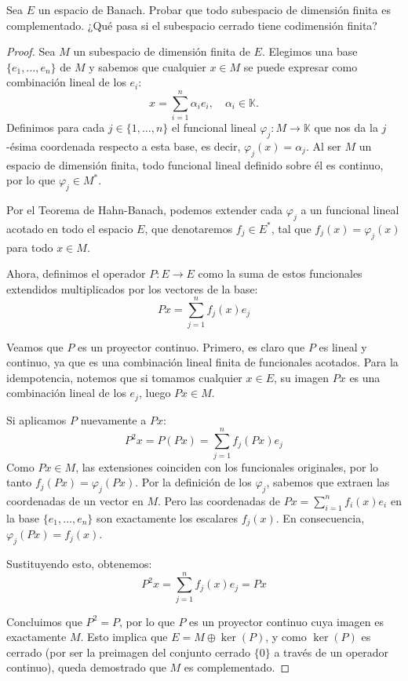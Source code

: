\documentclass{article}
\theoremstyle{definition}
\newenvironment{ejercicio}[1]{\begin{trivlist}
\item[\hskip \labelsep {\bfseries Ejercicio}\hskip \labelsep {\bfseries #1.}]}{\end{trivlist}}
\begin{document}
\begin{ejercicio}{2}
	Sea \( E \) un espacio de Banach. Probar que todo subespacio de dimensión finita es complementado. ¿Qué pasa si el subespacio cerrado tiene codimensión finita?
\end{ejercicio}
\begin{proof}
	Sea \( M \) un subespacio de dimensión finita de \( E \). Elegimos una base \( \{ e_1, \ldots, e_n \} \) de \( M \) y sabemos que cualquier \( x \in M \) se puede expresar como combinación lineal de los \( e_i \):\[
		x = \sum_{i=1}^{n} \alpha_i e_i, \quad \alpha_i \in \mathbb{K}.
	\]
	Definimos para cada \(j \in \{1, \dots, n\} \) el funcional lineal \(\varphi_j : M \to \mathbb{K}\) que nos da la \(j\)-ésima coordenada respecto a esta base, es decir, \(\varphi_j(x) = \alpha_j\). Al ser \(M\) un espacio de dimensión finita, todo funcional lineal definido sobre él es continuo, por lo que \(\varphi_j \in M^*\).

	Por el Teorema de Hahn-Banach, podemos extender cada \(\varphi_j\) a un funcional lineal acotado en todo el espacio \(E\), que denotaremos \(f_j \in E^*\), tal que \(f_j(x) = \varphi_j(x)\) para todo \(x \in M\).

	Ahora, definimos el operador \(P : E \to E\) como la suma de estos funcionales extendidos multiplicados por los vectores de la base:
	\[Px = \sum_{j=1}^n f_j(x) e_j\]

	Veamos que \(P\) es un proyector continuo. Primero, es claro que \(P\) es lineal y continuo, ya que es una combinación lineal finita de funcionales acotados. Para la idempotencia, notemos que si tomamos cualquier \(x \in E\), su imagen \(Px\) es una combinación lineal de los \(e_j\), luego \(Px \in M\).

	Si aplicamos \(P\) nuevamente a \(Px\):
	\[P^2x = P(Px) = \sum_{j=1}^n f_j(Px) e_j\]
	Como \(Px \in M\), las extensiones coinciden con los funcionales originales, por lo tanto \(f_j(Px) = \varphi_j(Px)\). Por la definición de los \(\varphi_j\), sabemos que extraen las coordenadas de un vector en \(M\). Pero las coordenadas de \(Px = \sum_{i=1}^n f_i(x) e_i\) en la base \( \{e_1, \dots, e_n\} \) son exactamente los escalares \(f_j(x)\). En consecuencia, \(\varphi_j(Px) = f_j(x)\).

	Sustituyendo esto, obtenemos:
	\[P^2x = \sum_{j=1}^n f_j(x) e_j = Px\]

	Concluimos que \(P^2 = P\), por lo que \(P\) es un proyector continuo cuya imagen es exactamente \(M\). Esto implica que \(E = M \oplus \ker(P)\), y como \(\ker(P)\) es cerrado (por ser la preimagen del conjunto cerrado \( \{0\} \) a través de un operador continuo), queda demostrado que \(M\) es complementado.


\end{proof}
\end{document}
